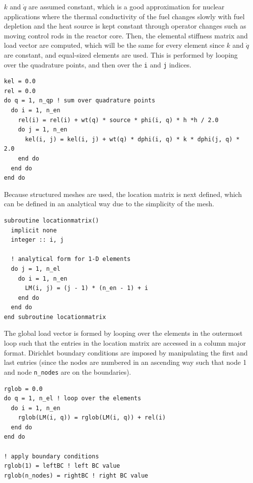 \documentclass[10pt]{article}
\begin{document}
\(k\) and \(\dot{q}\) are assumed constant, which is a good approximation for nuclear applications where the thermal conductivity of the fuel changes slowly with fuel depletion and the heat source is kept constant through operator changes such as moving control rods in the reactor core. Then, the elemental stiffness matrix and load vector are computed, which will be the same for every element since \(k\) and \(\dot{q}\) are constant, and equal-sized elements are used. This is performed by looping over the quadrature points, and then over the {\tt i} and {\tt j} indices. 

\begin{lstlisting}
kel = 0.0
rel = 0.0
do q = 1, n_qp ! sum over quadrature points
  do i = 1, n_en
    rel(i) = rel(i) + wt(q) * source * phi(i, q) * h *h / 2.0
    do j = 1, n_en
      kel(i, j) = kel(i, j) + wt(q) * dphi(i, q) * k * dphi(j, q) * 2.0
    end do
  end do
end do
\end{lstlisting}

Because structured meshes are used, the location matrix is next defined, which can be defined in an analytical way due to the simplicity of the mesh.

\begin{lstlisting}
subroutine locationmatrix()
  implicit none
  integer :: i, j

  ! analytical form for 1-D elements
  do j = 1, n_el
    do i = 1, n_en
      LM(i, j) = (j - 1) * (n_en - 1) + i
    end do
  end do
end subroutine locationmatrix
\end{lstlisting}

The global load vector is formed by looping over the elements in the outermost loop such that the entries in the location matrix are accessed in a column major format. Dirichlet boundary conditions are imposed by manipulating the first and last entries (since the nodes are numbered in an ascending way such that node 1 and node {\tt n\_nodes} are on the boundaries).

\begin{lstlisting}
rglob = 0.0
do q = 1, n_el ! loop over the elements
  do i = 1, n_en
    rglob(LM(i, q)) = rglob(LM(i, q)) + rel(i)
  end do
end do

! apply boundary conditions
rglob(1) = leftBC ! left BC value
rglob(n_nodes) = rightBC ! right BC value
\end{lstlisting}
\end{document}
